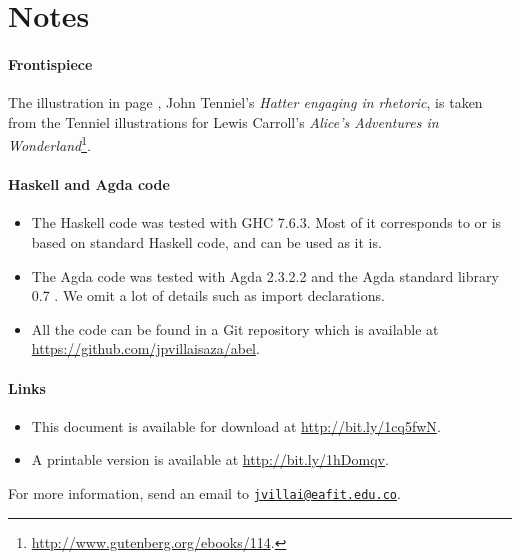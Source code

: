 \section{Notes}
\label{sec:introduction-notes}

\paragraph{Frontispiece}

The illustration in page \pageref{fig:hatter}, John Tenniel's
\emph{Hatter engaging in rhetoric}, is taken from the Tenniel
illustrations for Lewis Carroll's \emph{Alice's Adventures in
  Wonderland}\footnote{\url{http://www.gutenberg.org/ebooks/114}.}.

\paragraph{Haskell and Agda code}

\begin{itemize}
\item
  The Haskell code was tested with GHC 7.6.3. Most of it corresponds
  to or is based on standard Haskell code, and can be used as it is.

\item
  The Agda code was tested with Agda 2.3.2.2 and the Agda standard
  library 0.7 \parencite{danielsson-2013}. We omit a lot of details
  such as import declarations.

\item
  All the code can be found in a Git repository which is available at
  \url{https://github.com/jpvillaisaza/abel}.

\end{itemize}

\paragraph{Links}

\begin{itemize}
\item
  This document is available for download at
  \url{http://bit.ly/1cq5fwN}.

\item
  A printable version is available at \url{http://bit.ly/1hDomqv}.

\end{itemize}
For more information, send an email to
\href{mailto:jvillai@eafit.edu.co}{\nolinkurl{jvillai@eafit.edu.co}}.

\clearemptydoublepage
